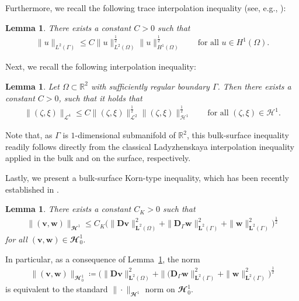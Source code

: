 \documentclass[10pt,reqno]{amsart}
\newtheorem{lemma}[theorem]{Lemma}
\theoremstyle{remark}
\numberwithin{equation}{section}
\newcommand{\norm}[1]{\| #1 \|}
\newcommand{\R}{\mathbb R}
\newcommand{\bv}{\mathbf{v}}
\newcommand{\bw}{\mathbf{w}}
\newcommand{\D}{\mathbf{D}}
\newcommand{\Dg}{\mathbf{D}_\Gamma}
\newcommand{\Om}{\Omega}
\newcommand{\Ga}{\Gamma}
\begin{document}
Furthermore, we recall the following trace interpolation inequality (see, e.g., \cite{Necas2012}):

\begin{lemma}\label{Prelim:Lemma:Interpol:Trace}
    There exists a constant $C > 0$ such that
    \begin{align}\label{InterpolEst:Trace:L^2}
        \norm{u}_{L^2(\Ga)}\leq C\norm{u}_{L^2(\Om)}^{\frac12}\norm{u}_{H^1(\Om)}^{\frac12} \qquad\text{for all~}u\in H^1(\Om).
    \end{align}
\end{lemma}

Next, we recall the following interpolation inequality:
\begin{lemma}
    Let $\Om\subset\R^2$ with sufficiently regular boundary $\Ga$. Then there exists a constant $C > 0$, such that it holds that
	\begin{align}\label{InterpolEst:L^4}
		\norm{(\zeta,\xi)}_{\mathcal{L}^4}\leq C\norm{(\zeta,\xi)}_{\mathcal{L}^2}^{\frac12}\norm{(\zeta,\xi)}_{\mathcal{H}^1}^{\frac12} \qquad\text{for all~}(\zeta,\xi)\in\mathcal{H}^1.
	\end{align}
\end{lemma}

Note that, as $\Gamma$ is $1$-dimensional submanifold of $\R^2$, this bulk-surface inequality readily follows directly from the classical Ladyzhenskaya interpolation inequality applied in the bulk and on the surface, respectively.


Lastly, we present a bulk-surface Korn-type inequality, which has been recently established in \cite[Lemma~5.1]{Knopf2025a}.

\begin{lemma}\label{Lemma:Korn}
    There exists a constant $C_K > 0$ such that
    \begin{align}\label{Est:Korn}
        \norm{(\bv,\bw)}_{\mathbfcal{H}^1} \leq C_K\big(\norm{\D\bv}_{\mathbf{L}^2(\Om)}^2 + \norm{\Dg\bw}_{\mathbf{L}^2(\Ga)}^2 + \norm{\bw}_{\mathbf{L}^2(\Ga)}^2\big)^{\frac12}
    \end{align}
    for all $(\bv,\bw)\in\mathbfcal{H}^1_0$.
\end{lemma}

In particular, as a consequence of Lemma~\ref{Lemma:Korn}, the norm
\begin{align*}
    \norm{(\bv,\bw)}_{\mathbfcal{H}^1_0} \coloneqq \big(\norm{\D\bv}_{\mathbf{L}^2(\Om)}^2 + \norm{(\Dg\bw}_{\mathbf{L}^2(\Ga)}^2 + \norm{\bw}_{\mathbf{L}^2(\Ga)}^2\big)^{\frac12}
\end{align*}
is  equivalent to the standard $\norm{\cdot}_{\mathbfcal{H}^1}$ norm on $\mathbfcal{H}^1_0$.
\end{document}
